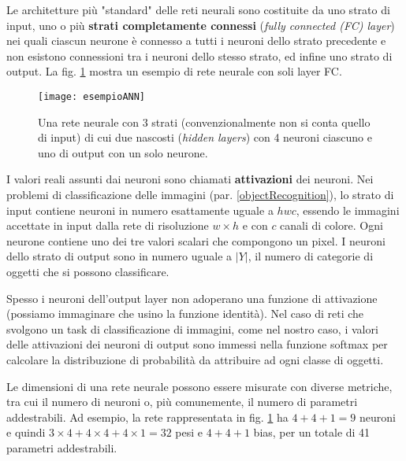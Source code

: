 Le architetture più "standard" delle reti neurali sono costituite da uno strato di input, uno o più \textbf{strati completamente connessi} (\textit{fully connected (FC) layer}) nei quali ciascun neurone è connesso a tutti i neuroni dello strato precedente e non esistono connessioni tra i neuroni dello stesso strato, ed infine uno strato di output. La fig. \ref{fig:esempioANN} mostra un esempio di rete neurale con soli layer FC.

\begin{figure}[h]
\centering
\texttt{[image: esempioANN]}
\caption{Una rete neurale con 3 strati (convenzionalmente non si conta quello di input) di cui due nascosti (\textit{hidden layers}) con 4 neuroni ciascuno e uno di output con un solo neurone.}
\label{fig:esempioANN}
\end{figure}

I valori reali assunti dai neuroni sono chiamati \textbf{attivazioni} dei neuroni.
Nei problemi di classificazione delle immagini (par. \ref{objectRecognition}), lo strato di input contiene neuroni in numero esattamente uguale a $hwc$, essendo le immagini accettate in input dalla rete di risoluzione $w\times h$ e con $c$ canali di colore. Ogni neurone contiene uno dei tre valori scalari che compongono un pixel. I neuroni dello strato di output sono in numero uguale a $|Y|$, il numero di categorie di oggetti che si possono classificare.

Spesso i neuroni dell'output layer non adoperano una funzione di attivazione (possiamo immaginare che usino la funzione identità). Nel caso di reti che svolgono un task di classificazione di immagini, come nel nostro caso, i valori delle attivazioni dei neuroni di output sono immessi nella funzione softmax per calcolare la distribuzione di probabilità da attribuire ad ogni classe di oggetti.

Le dimensioni di una rete neurale possono essere misurate con diverse metriche, tra cui il numero di neuroni o, più comunemente, il numero di parametri addestrabili. Ad esempio, la rete rappresentata in fig. \ref{fig:esempioANN} ha $4+4+1=9$ neuroni e quindi $3\times 4 + 4\times 4 + 4\times 1 = 32$ pesi e $4+4+1$ bias, per un totale di 41 parametri addestrabili.

